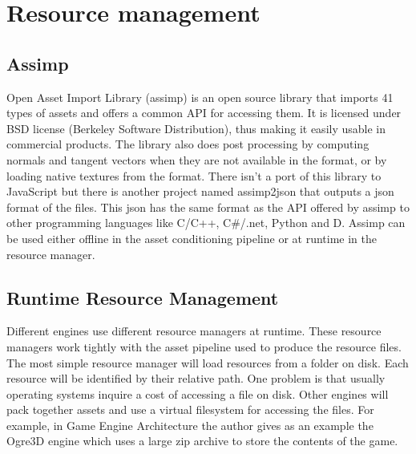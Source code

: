 \section{Resource management}

\subsection{Assimp}

Open Asset Import Library (assimp) is an open source library that imports 41 types of assets and offers a common API for accessing them. It is licensed under BSD license (Berkeley Software Distribution), thus making it easily usable in commercial products. The library also does post processing by computing normals and tangent vectors when they are not available in the format, or by loading native textures from the format. There isn’t a port of this library to JavaScript but there is another project named assimp2json that outputs a json format of the files. This json has the same format as the API offered by assimp to other programming languages like C/C++, C\#/.net, Python and D.  Assimp can be used either offline in the asset conditioning pipeline or at runtime in the resource manager.

\subsection{Runtime Resource Management}

Different engines use different resource managers at runtime. These resource managers work tightly with the asset pipeline used to produce the resource files.
The most simple resource manager will load resources from a folder on disk. Each resource will be identified by their relative path. One problem is that usually operating systems inquire a cost of accessing a file on disk. Other engines will pack together assets and use a virtual filesystem for accessing the files. For example, in Game Engine Architecture \cite{gregory09} the author gives as an example the Ogre3D engine which uses a large zip archive to store the contents of the game.





